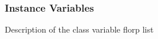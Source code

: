 \documentclass{article}
\begin{document}
    \subsubsection{Instance Variables}

      \begin{EpydocClassVariableList}
                       {Description of the class variable florp}
                       {list} %
                       {}     %
      \end{EpydocClassVariableList}

\end{document}
